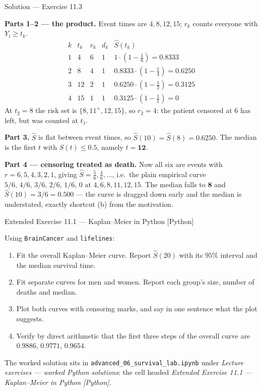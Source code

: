 \documentclass[aspectratio=169,11pt]{beamer}
\begin{document}
\begin{frame}{Solution --- Exercise 11.3}
  \footnotesize
\begin{solutionbox}
  \scriptsize
  \textbf{Parts 1--2 --- the product.} Event times are $4,8,12,15$; $r_k$ counts everyone
  with $Y_i\ge t_k$.
  \[
    \begin{array}{c|c|c|c|l}
      k & t_k & r_k & d_k & \hat S(t_k)\\ \hline
      1 & 4  & 6 & 1 & 1\cdot(1-\tfrac16)=0.8333\\
      2 & 8  & 4 & 1 & 0.8333\cdot(1-\tfrac14)=0.6250\\
      3 & 12 & 2 & 1 & 0.6250\cdot(1-\tfrac12)=0.3125\\
      4 & 15 & 1 & 1 & 0.3125\cdot(1-\tfrac11)=0
    \end{array}
  \]
  At $t_2=8$ the risk set is $\{8,11^{+},12,15\}$, so $r_2=4$: the patient censored at
  $6$ has left, but was counted at $t_1$.

  \medskip
  \textbf{Part 3.} $\hat S$ is flat between event times, so $\hat S(10)=\hat S(8)=0.6250$.
  The median is the first $t$ with $\hat S(t)\le 0.5$, namely $t=\mathbf{12}$.

  \medskip
  \textbf{Part 4 --- censoring treated as death.} Now all six are events with
  $r=6,5,4,3,2,1$, giving $\hat S=\tfrac56,\tfrac46,\dots$, i.e.\ the plain empirical
  curve $5/6,\,4/6,\,3/6,\,2/6,\,1/6,\,0$ at $4,6,8,11,12,15$. The median falls to
  $\mathbf{8}$ and $\hat S(10)=3/6=0.500$ --- the curve is dragged down early and the
  median is understated, exactly shortcut (b) from the motivation.
\end{solutionbox}
\end{frame}

\begin{frame}{Extended Exercise 11.1 --- Kaplan--Meier in Python [Python]}
\begin{longexercise}
  Using \texttt{BrainCancer} and \texttt{lifelines}:
  \begin{enumerate}
    \item Fit the overall Kaplan--Meier curve. Report $\hat S(20)$ with its $95\%$
          interval and the median survival time.
    \item Fit separate curves for men and women. Report each group's size, number of
          deaths and median.
    \item Plot both curves with censoring marks, and say in one sentence what the plot
          suggests.
    \item Verify by direct arithmetic that the first three steps of the overall curve
          are $0.9886$, $0.9771$, $0.9654$.
  \end{enumerate}
\end{longexercise}
\begin{labnote}
  The worked solution sits in \texttt{advanced\_06\_survival\_lab.ipynb} under
  \emph{Lecture exercises --- worked Python solutions}: the cell headed
  \emph{Extended Exercise 11.1 --- Kaplan--Meier in Python [Python]}.
\end{labnote}
\end{frame}
\end{document}
